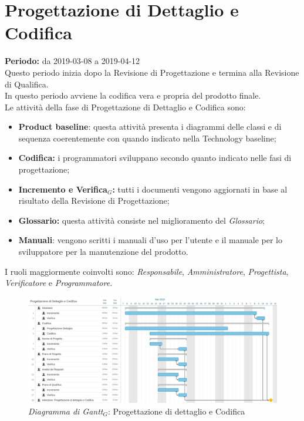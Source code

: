 \section{Progettazione di Dettaglio e Codifica}
\textbf{Periodo:} da 2019-03-08 a 2019-04-12\\
Questo periodo inizia dopo la Revisione di Progettazione e termina  alla Revisione di Qualifica.\\
In questo periodo avviene la codifica vera e propria del prodotto finale.\\
Le attività della fase di Progettazione di Dettaglio e Codifica sono:
\begin{itemize}
	\item \textbf{Product baseline}: questa attività presenta i diagrammi delle classi e di sequenza coerentemente con quando indicato nella Technology baseline; 
    \item \textbf{Codifica:} i programmatori sviluppano secondo quanto indicato nelle fasi di progettazione;
    \item \textbf{Incremento e Verifica$_{G}$:} tutti i documenti vengono aggiornati in base al risultato della Revisione di Progettazione;
    \item \textbf{Glossario:} questa attività consiste nel miglioramento del \textit{Glossario};
    \item \textbf{Manuali}: vengono scritti i manuali d'uso per l'utente e il manuale per lo sviluppatore per la manutenzione del prodotto.
\end{itemize}
I ruoli maggiormente coinvolti sono: \textit{Responsabile}, \textit{Amministratore}, \textit{Progettista}, \textit{Verificatore} e \textit{Programmatore}.
\begin{figure} [h]
    \centering
    \includegraphics[scale=0.14]{./images/codifica.jpg}
    \caption{\textit{Diagramma di Gantt$_{G}$}: Progettazione di dettaglio e Codifica }\label{}
\end{figure}
\newpage

